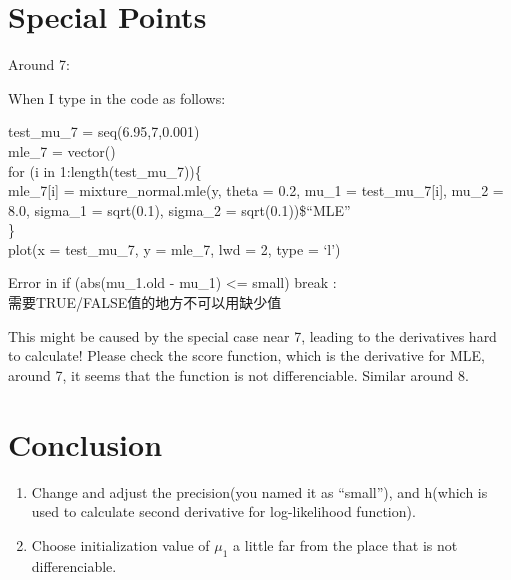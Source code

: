 \documentclass[12pt]{article}
\providecommand{\tightlist}{%
  \setlength{\itemsep}{0pt}\setlength{\parskip}{0pt}}
\begin{document}
\section{Special Points}

Around 7:

When I type in the code as follows:

test\_mu\_7 = seq(6.95,7,0.001)\\
mle\_7 = vector()\\
for (i in 1:length(test\_mu\_7))\{\\
mle\_7{[}i{]} = mixture\_normal.mle(y, theta = 0.2, mu\_1 =
test\_mu\_7{[}i{]}, mu\_2 = 8.0, sigma\_1 = sqrt(0.1), sigma\_2 =
sqrt(0.1))\$``MLE''\\
\}\\
plot(x = test\_mu\_7, y = mle\_7, lwd = 2, type = `l')

Error in if (abs(mu\_1.old - mu\_1) \textless= small) break :\\
需要TRUE/FALSE值的地方不可以用缺少值

This might be caused by the special case near 7, leading to the
derivatives hard to calculate! Please check the score function, which is
the derivative for MLE, around 7, it seems that the function is not
differenciable. Similar around 8.

\section{Conclusion}

\begin{enumerate}
\def\labelenumi{\arabic{enumi}.}
\tightlist
\item
  Change and adjust the precision(you named it as ``small''), and
  h(which is used to calculate second derivative for log-likelihood
  function).\\
\item
  Choose initialization value of \(\mu_1\) a little far from the place
  that is not differenciable.
\end{enumerate}



\end{document}
